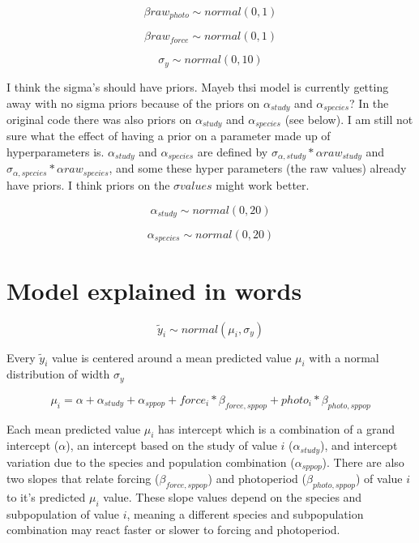 \documentclass[11pt,letter]{article}
\begin{document}
\begin{equation}
\beta raw_{photo}\sim normal(0,1)
\end{equation}

\begin{equation}
\beta raw_{force}\sim normal(0,1)
\end{equation}

   
\begin{equation}
\sigma{_y}\sim normal(0,10)
\end{equation}

I think the sigma's should have priors. Mayeb thsi model is currently getting away with no sigma priors because of the priors on $\alpha_{study} $ and $\alpha_{species}$? In the original code there was also priors on $\alpha_{study} $ and $\alpha_{species}$ (see below). I am still not sure what the effect of having a prior on a parameter made up of hyperparameters is. $\alpha_{study} $ and $\alpha_{species}$ are defined by $ \sigma_{\alpha, study} * \alpha raw_{study}$ and $ \sigma_{\alpha, species} * \alpha raw_{species}$, and some these hyper parameters (the raw values) already have priors. I think priors on the $\sigma values$ might work better.  

\begin{equation}
\alpha_{study}  \sim normal(0,20)
\end{equation}

\begin{equation}
\alpha_{species}  \sim normal(0,20)
\end{equation}


\section{Model explained in words}



\begin{equation}
\tilde{y}_{i}\sim normal(\mu_{i},\sigma_{y})
\end{equation}

Every $\tilde{y}_{i}$ value is centered around a mean predicted value $\mu_{i}$ with a normal distribution of width $\sigma_{y}$

\begin{equation}
\mu_{i} = \alpha + \alpha_{study} + \alpha_{sppop} + force_{i} * \beta _{force,sppop} + photo_{i} * \beta _{photo,sppop} 
\end{equation}

Each mean predicted value $\mu_{i}$ has intercept which is a combination of a grand intercept ($\alpha$), an intercept based on the study of value $i$ ($\alpha_{study}$), and intercept variation due to the species and population combination ($\alpha_{sppop}$). There are also two slopes that relate forcing ($\beta _{force,sppop} $) and photoperiod ($\beta _{photo,sppop} $) of value $i$ to it's predicted $\mu_{i}$ value. These slope values depend on the species and subpopulation of value $i$, meaning a different species and subpopulation combination may react faster or slower to forcing and photoperiod. 
\end{document}
